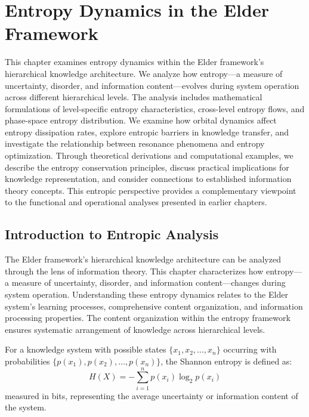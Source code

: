 \chapter{Entropy Dynamics in the Elder Framework}

\begin{tcolorbox}[colback=blue!5!white,colframe=blue!75!black,title=Chapter Summary]
This chapter examines entropy dynamics within the Elder framework's hierarchical knowledge architecture. We analyze how entropy—a measure of uncertainty, disorder, and information content—evolves during system operation across different hierarchical levels. The analysis includes mathematical formulations of level-specific entropy characteristics, cross-level entropy flows, and phase-space entropy distribution. We examine how orbital dynamics affect entropy dissipation rates, explore entropic barriers in knowledge transfer, and investigate the relationship between resonance phenomena and entropy optimization. Through theoretical derivations and computational examples, we describe the entropy conservation principles, discuss practical implications for knowledge representation, and consider connections to established information theory concepts. This entropic perspective provides a complementary viewpoint to the functional and operational analyses presented in earlier chapters.
\end{tcolorbox}

\section{Introduction to Entropic Analysis}

The Elder framework's hierarchical knowledge architecture can be analyzed through the lens of information theory. This chapter characterizes how entropy—a measure of uncertainty, disorder, and information content—changes during system operation. Understanding these entropy dynamics relates to the Elder system's learning processes, comprehensive content organization, and information processing properties. The content organization within the entropy framework ensures systematic arrangement of knowledge across hierarchical levels.

\begin{definition}
For a knowledge system with possible states $\{x_1, x_2, \ldots, x_n\}$ occurring with probabilities $\{p(x_1), p(x_2), \ldots, p(x_n)\}$, the Shannon entropy is defined as:
\begin{equation}
H(X) = -\sum_{i=1}^{n} p(x_i) \log_2 p(x_i)
\end{equation}
measured in bits, representing the average uncertainty or information content of the system.
\end{definition}

